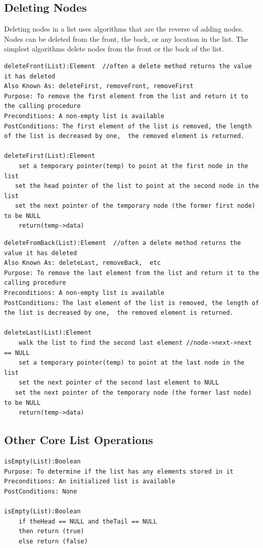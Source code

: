 \subsection{Deleting Nodes}

Deleting nodes in a list  uses algorithms that are the reverse of adding nodes.  Nodes can be deleted from the front, the back, or any location in the list.   The simplest algorithms delete nodes from the front or the back of the list.  


\begin{lstlisting}
deleteFront(List):Element  //often a delete method returns the value it has deleted
Also Known As: deleteFirst, removeFront, removeFirst
Purpose: To remove the first element from the list and return it to the calling procedure
Preconditions: A non-empty list is available
PostConditions: The first element of the list is removed, the length of the list is decreased by one,  the removed element is returned.

deleteFirst(List):Element
    set a temporary pointer(temp) to point at the first node in the list
   set the head pointer of the list to point at the second node in the list
   set the next pointer of the temporary node (the former first node)  to be NULL
    return(temp->data)
\end{lstlisting}

\begin{lstlisting}
deleteFromBack(List):Element  //often a delete method returns the value it has deleted
Also Known As: deleteLast, removeBack,  etc
Purpose: To remove the last element from the list and return it to the calling procedure
Preconditions: A non-empty list is available
PostConditions: The last element of the list is removed, the length of the list is decreased by one,  the removed element is returned.

deleteLast(List):Element
	walk the list to find the second last element //node->next->next == NULL
    set a temporary pointer(temp) to point at the last node in the list
    set the next pointer of the second last element to NULL
   set the next pointer of the temporary node (the former last node)  to be NULL
    return(temp->data)
\end{lstlisting}


\subsection{Other Core List Operations}

\begin{lstlisting}
isEmpty(List):Boolean
Purpose: To determine if the list has any elements stored in it   
Preconditions: An initialized list is available
PostConditions: None

isEmpty(List):Boolean
    if theHead == NULL and theTail == NULL
    then return (true)
    else return (false)
\end{lstlisting}   



